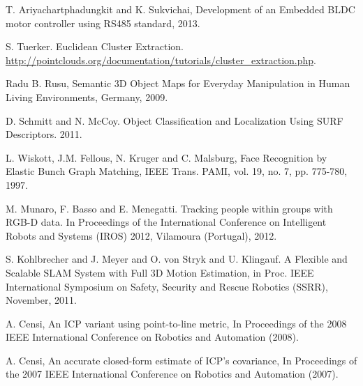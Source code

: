 \documentclass{llncs}
\begin{document}
\begin{thebibliography}{4}

 T. Ariyachartphadungkit and K. Sukvichai, Development of an Embedded BLDC motor controller using RS485 standard, 2013.

 S. Tuerker. Euclidean Cluster Extraction.\\
\url{http://pointclouds.org/documentation/tutorials/cluster_extraction.php}.

 Radu B. Rusu, 
Semantic 3D Object Maps for Everyday Manipulation in Human Living Environments, Germany, 2009.

 D. Schmitt and N. McCoy. Object Classification and Localization Using SURF Descriptors. 2011.

 L. Wiskott, J.M. Fellous, N. Kruger and C. Malsburg, Face Recognition by Elastic Bunch Graph Matching, IEEE Trans. PAMI, vol. 19, no. 7, pp. 775-780, 1997. 

 M. Munaro, F. Basso and E. Menegatti. Tracking people within groups with RGB-D data. In Proceedings of the International Conference on Intelligent Robots and Systems (IROS) 2012, Vilamoura (Portugal), 2012.

 S. Kohlbrecher and J. Meyer and O. von Stryk and U. Klingauf. A Flexible and Scalable SLAM System with Full 3D Motion Estimation, in Proc. IEEE International Symposium on Safety, Security and Rescue Robotics (SSRR), November, 2011.

 A. Censi, An ICP variant using point-to-line metric, In Proceedings of the 2008 IEEE International Conference on Robotics and Automation (2008).

 A. Censi, An accurate closed-form estimate of ICP's covariance, In Proceedings of the 2007 IEEE International Conference on Robotics and Automation (2007).

\end{thebibliography}
\end{document}

